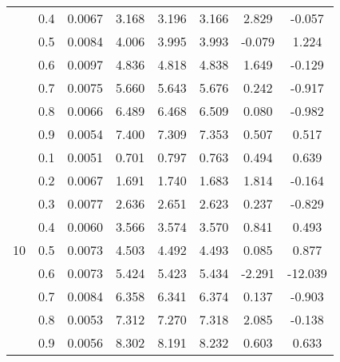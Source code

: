 \documentclass[11pt,a4paper]{report}
\begin{document}
\begin{longtable}{ | c | c || c | c | c | c | c | c | }
 & 0.4 & 0.0067 & 3.168 & 3.196 & 3.166 & 2.829 & -0.057 \\
 & 0.5 & 0.0084 & 4.006 & 3.995 & 3.993 & -0.079 & 1.224 \\
 & 0.6 & 0.0097 & 4.836 & 4.818 & 4.838 & 1.649 & -0.129 \\
 & 0.7 & 0.0075 & 5.660 & 5.643 & 5.676 & 0.242 & -0.917 \\
 & 0.8 & 0.0066 & 6.489 & 6.468 & 6.509 & 0.080 & -0.982 \\
 & 0.9 & 0.0054 & 7.400 & 7.309 & 7.353 & 0.507 & 0.517 \\
 \hline
\multirow{9}{*}{10} & 0.1 & 0.0051 & 0.701 & 0.797 & 0.763 & 0.494 & 0.639 \\
 & 0.2 & 0.0067 & 1.691 & 1.740 & 1.683 & 1.814 & -0.164 \\
 & 0.3 & 0.0077 & 2.636 & 2.651 & 2.623 & 0.237 & -0.829 \\
 & 0.4 & 0.0060 & 3.566 & 3.574 & 3.570 & 0.841 & 0.493 \\
 & 0.5 & 0.0073 & 4.503 & 4.492 & 4.493 & 0.085 & 0.877 \\
 & 0.6 & 0.0073 & 5.424 & 5.423 & 5.434 & -2.291 & -12.039 \\
 & 0.7 & 0.0084 & 6.358 & 6.341 & 6.374 & 0.137 & -0.903 \\
 & 0.8 & 0.0053 & 7.312 & 7.270 & 7.318 & 2.085 & -0.138 \\
 & 0.9 & 0.0056 & 8.302 & 8.191 & 8.232 & 0.603 & 0.633 \\
 \hline
\hline
\end{longtable}
\end{document}
